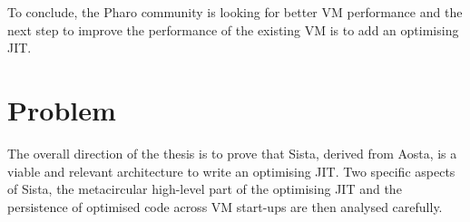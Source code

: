 \documentclass[a4paper,12pt,twoside]{../includes/ThesisStyle}
\begin{document}
	
To conclude, the Pharo community is looking for better VM performance and the next step to improve the performance of the existing VM is to add an optimising JIT. %



\section{Problem}

The overall direction of the thesis is to prove that Sista, derived from Aosta, is a viable and relevant architecture to write an optimising JIT. Two specific aspects of Sista, the metacircular high-level part of the optimising JIT and the persistence of optimised code across VM start-ups are then analysed carefully.
\end{document}
